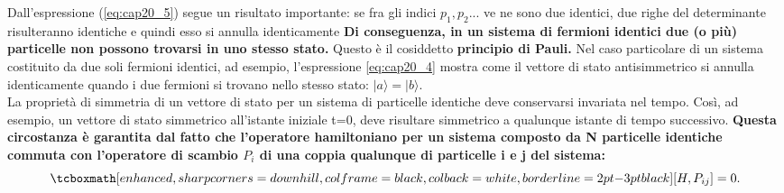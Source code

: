 Dall'espressione (\ref{eq:cap20_5}) segue un risultato importante: se fra gli indici $p_1, p_2...$ ve ne sono due identici, due righe del determinante risulteranno identiche e quindi esso si annulla identicamente \textbf{Di conseguenza, in un sistema di fermioni identici due (o pi\`u) particelle non possono trovarsi in uno stesso stato.} Questo è il cosiddetto \textbf{principio di Pauli.} Nel caso particolare di un sistema costituito da due soli fermioni identici, ad esempio, l'espressione \ref{eq:cap20_4} mostra come il vettore di stato antisimmetrico si annulla identicamente quando i due fermioni si trovano nello stesso stato: $|a\rangle= |b\rangle$.\\

La proprietà di simmetria di un vettore di stato per un sistema di particelle identiche deve conservarsi invariata nel tempo. Così, ad esempio, un vettore di stato simmetrico all'istante iniziale t=0, deve risultare simmetrico a qualunque istante di tempo successivo. \textbf{Questa circostanza è garantita dal fatto che l'operatore hamiltoniano per un sistema composto da N particelle identiche commuta con l'operatore di scambio $P_{i}$ di una coppia qualunque di particelle i e j del sistema:}\\
	\begin{equation}
		\tcboxmath[enhanced, sharp corners=downhill, colframe=black, colback=white, borderline={2pt}{-3pt}{black}]{
			\left [ H, P_{ij}\right ]=0.
			 }
	\end{equation}\\
	
